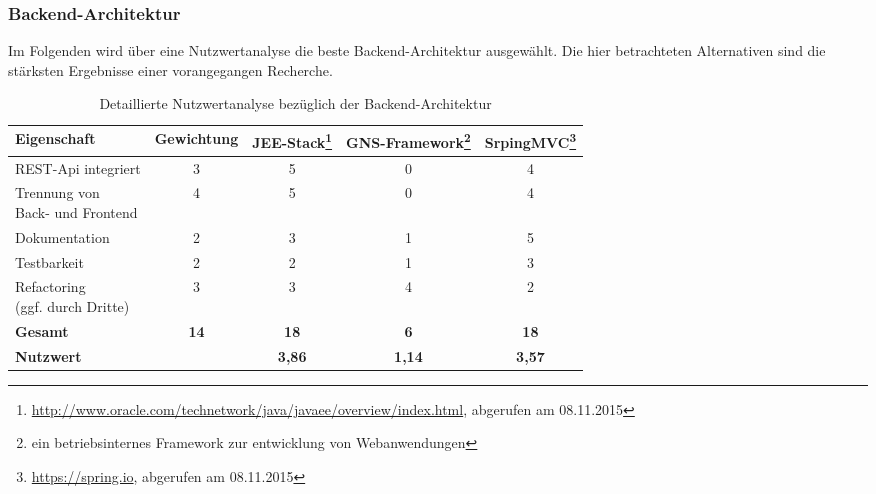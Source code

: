 \label{app:nutzwertanalyse}

\subsubsection{Backend-Architektur}

Im Folgenden wird über eine Nutzwertanalyse die beste Backend-Architektur ausgewählt.
Die hier betrachteten Alternativen sind die stärksten Ergebnisse einer vorangegangen Recherche. 

\begin{savenotes}
\begin{table}[H]
	\centering
	\begin{tabular}{lcccc}

		\rowcolor{white!15}				
		\textbf{Eigenschaft} 			& \textbf{Gewichtung}
			& \textbf{JEE-Stack\footnote{\url{http://www.oracle.com/technetwork/java/javaee/overview/index.html}, abgerufen am 08.11.2015}}
			& \textbf{GNS-Framework\footnote{ein betriebsinternes Framework zur entwicklung von Webanwendungen}}
			& \textbf{SrpingMVC\footnote{\url{https://spring.io}, abgerufen am 08.11.2015}} \\\hline		
		
		REST-Api integriert				& 3						& 5						& 0							& 4 \\
		\pbox{4cm}{Trennung von \\ Back- und Frontend}	& 4						& 5						& 0							& 4 \\						
		Dokumentation					& 2						& 3						& 1							& 5 \\
		Testbarkeit						& 2						& 2						& 1							& 3 \\
		\pbox{4cm}{Refactoring \\(ggf. durch Dritte)}	& 3						& 3						& 4							& 2 \\
		
		\rowcolor{MidnightBlue!15}
		\textbf{Gesamt}				& \textbf{14}			& \textbf{18}			& \textbf{6}				& \textbf{18} \\\hline
		\rowcolor{white!15}				
		\textbf{Nutzwert} 				& 						& \textbf{3,86}			& \textbf{1,14} 			& \textbf{3,57} \\
											
			    
	\end{tabular}
	
	\caption{Detaillierte Nutzwertanalyse bezüglich der Backend-Architektur}
	\label{tab:nutzwertanalyse_backend}
\end{table}
\end{savenotes}


